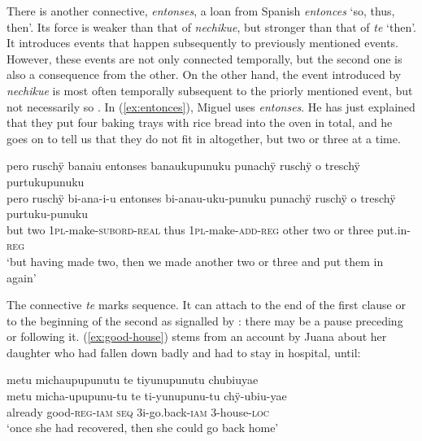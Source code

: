 
There is another  connective, \textit{entonses}, a loan from Spanish \textit{entonces} ‘so, thus, then’. Its  force is weaker than that of \textit{nechikue}, but stronger than that of  \textit{te} ‘then’. It introduces events that happen subsequently to previously mentioned events. However, these events are not only connected temporally, but the second one is also a consequence from the other. On the other hand, the event introduced by \textit{nechikue} is most often temporally subsequent to the priorly mentioned event, but not necessarily so \citep[142]{DanielsenTerhart2015}. In (\ref{ex:entonces}), Miguel uses \textit{entonses}. He has just explained that they put four baking trays with rice bread into the oven in total, and he goes on to tell us that they do not fit in altogether, but two or three at a time.

\ea\label{ex:entonces}
\begingl
\glpreamble  pero ruschÿ banaiu entonses banaukupunuku punachÿ ruschÿ o treschÿ\\ purtukupunuku\\
\gla pero ruschÿ bi-ana-i-u entonses bi-anau-uku-punuku punachÿ ruschÿ o treschÿ purtuku-punuku\\
\glb but two 1\textsc{pl}-make-\textsc{subord}-\textsc{real} thus 1\textsc{pl}-make-\textsc{add}-\textsc{reg} other two or three put.in-\textsc{reg}\\
\glft ‘but having made two, then we made another two or three and put them in again’
\endgl
\trailingcitation{[mxx-e120415ls.097]}
\xe

The connective \textit{te} marks sequence. It can attach to the end of the first clause or to the beginning of the second as signalled by : there may be a pause preceding or following it. (\ref{ex:good-house}) stems from an account by Juana about her daughter who had fallen down badly and had to stay in hospital, until:

\ea\label{ex:good-house}
\begingl
\glpreamble metu michaupupunutu te tiyunupunutu chubiuyae\\
\gla metu micha-upupunu-tu te ti-yunupunu-tu chÿ-ubiu-yae\\
\glb already good-\textsc{reg}-\textsc{iam} \textsc{seq} 3i-go.back-\textsc{iam} 3-house-\textsc{loc}\\
\glft ‘once she had recovered, then she could go back home’
\endgl
\trailingcitation{[jxx-p110923l-1.477]}
\xe

